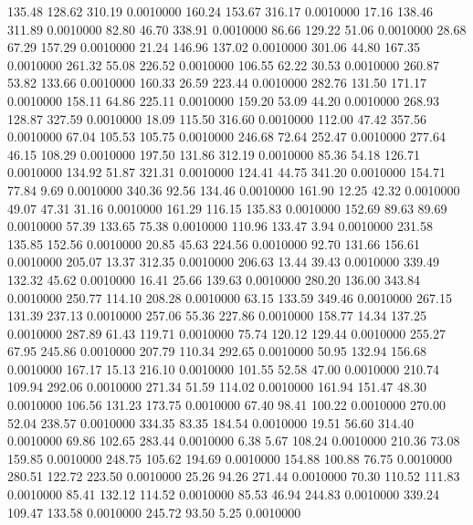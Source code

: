 135.48  128.62  310.19   0.0010000
 160.24  153.67  316.17   0.0010000
  17.16  138.46  311.89   0.0010000
  82.80   46.70  338.91   0.0010000
  86.66  129.22   51.06   0.0010000
  28.68   67.29  157.29   0.0010000
  21.24  146.96  137.02   0.0010000
 301.06   44.80  167.35   0.0010000
 261.32   55.08  226.52   0.0010000
 106.55   62.22   30.53   0.0010000
 260.87   53.82  133.66   0.0010000
 160.33   26.59  223.44   0.0010000
 282.76  131.50  171.17   0.0010000
 158.11   64.86  225.11   0.0010000
 159.20   53.09   44.20   0.0010000
 268.93  128.87  327.59   0.0010000
  18.09  115.50  316.60   0.0010000
 112.00   47.42  357.56   0.0010000
  67.04  105.53  105.75   0.0010000
 246.68   72.64  252.47   0.0010000
 277.64   46.15  108.29   0.0010000
 197.50  131.86  312.19   0.0010000
  85.36   54.18  126.71   0.0010000
 134.92   51.87  321.31   0.0010000
 124.41   44.75  341.20   0.0010000
 154.71   77.84    9.69   0.0010000
 340.36   92.56  134.46   0.0010000
 161.90   12.25   42.32   0.0010000
  49.07   47.31   31.16   0.0010000
 161.29  116.15  135.83   0.0010000
 152.69   89.63   89.69   0.0010000
  57.39  133.65   75.38   0.0010000
 110.96  133.47    3.94   0.0010000
 231.58  135.85  152.56   0.0010000
  20.85   45.63  224.56   0.0010000
  92.70  131.66  156.61   0.0010000
 205.07   13.37  312.35   0.0010000
 206.63   13.44   39.43   0.0010000
 339.49  132.32   45.62   0.0010000
  16.41   25.66  139.63   0.0010000
 280.20  136.00  343.84   0.0010000
 250.77  114.10  208.28   0.0010000
  63.15  133.59  349.46   0.0010000
 267.15  131.39  237.13   0.0010000
 257.06   55.36  227.86   0.0010000
 158.77   14.34  137.25   0.0010000
 287.89   61.43  119.71   0.0010000
  75.74  120.12  129.44   0.0010000
 255.27   67.95  245.86   0.0010000
 207.79  110.34  292.65   0.0010000
  50.95  132.94  156.68   0.0010000
 167.17   15.13  216.10   0.0010000
 101.55   52.58   47.00   0.0010000
 210.74  109.94  292.06   0.0010000
 271.34   51.59  114.02   0.0010000
 161.94  151.47   48.30   0.0010000
 106.56  131.23  173.75   0.0010000
  67.40   98.41  100.22   0.0010000
 270.00   52.04  238.57   0.0010000
 334.35   83.35  184.54   0.0010000
  19.51   56.60  314.40   0.0010000
  69.86  102.65  283.44   0.0010000
   6.38    5.67  108.24   0.0010000
 210.36   73.08  159.85   0.0010000
 248.75  105.62  194.69   0.0010000
 154.88  100.88   76.75   0.0010000
 280.51  122.72  223.50   0.0010000
  25.26   94.26  271.44   0.0010000
  70.30  110.52  111.83   0.0010000
  85.41  132.12  114.52   0.0010000
  85.53   46.94  244.83   0.0010000
 339.24  109.47  133.58   0.0010000
 245.72   93.50    5.25   0.0010000
